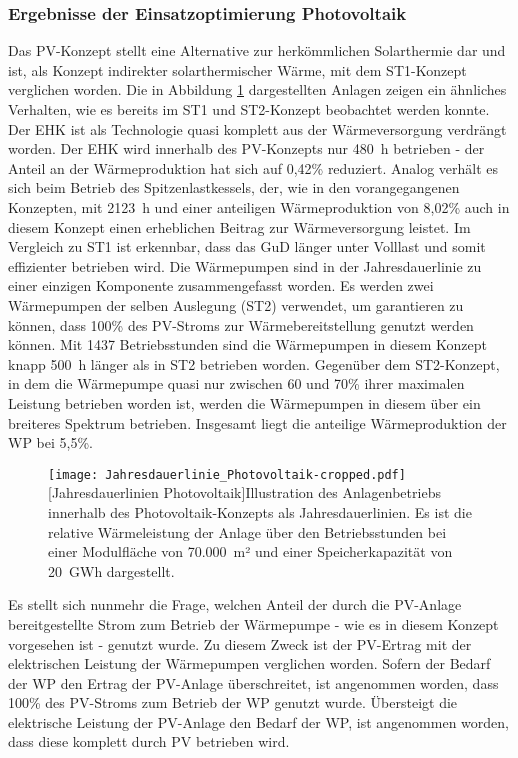\subsubsection{Ergebnisse der Einsatzoptimierung Photovoltaik}
Das \acl{PV}-Konzept stellt eine Alternative zur herkömmlichen Solarthermie dar und ist, als Konzept indirekter solarthermischer Wärme, mit dem ST1-Konzept verglichen worden. Die in Abbildung \ref{figure: Jahresdauerlinie_Photovoltaik} dargestellten Anlagen zeigen ein ähnliches Verhalten, wie es bereits im ST1 und ST2-Konzept beobachtet werden konnte. Der \ac{EHK} ist als Technologie quasi komplett aus der Wärmeversorgung verdrängt worden. Der \ac{EHK} wird innerhalb des \ac{PV}-Konzepts nur 480~h betrieben - der Anteil an der Wärmeproduktion hat sich auf 0,42\% reduziert. Analog verhält es sich beim Betrieb des Spitzenlastkessels, der, wie in den vorangegangenen Konzepten, mit 2123~h und einer anteiligen Wärmeproduktion von 8,02\% auch in diesem Konzept einen erheblichen Beitrag zur Wärmeversorgung leistet. Im Vergleich zu ST1 ist erkennbar, dass das \ac{GuD} länger unter Volllast und somit effizienter betrieben wird. Die Wärmepumpen sind in der Jahresdauerlinie zu einer einzigen Komponente zusammengefasst worden. Es werden zwei Wärmepumpen der selben Auslegung (ST2) verwendet, um garantieren zu können, dass 100\% des \ac{PV}-Stroms zur Wärmebereitstellung genutzt werden können.   Mit 1437 Betriebsstunden sind die Wärmepumpen in diesem Konzept knapp 500~h länger als in ST2 betrieben worden. Gegenüber dem ST2-Konzept, in dem die Wärmepumpe quasi nur zwischen 60 und 70\% ihrer maximalen Leistung betrieben worden ist, werden die Wärmepumpen in diesem über ein breiteres Spektrum betrieben. Insgesamt liegt die anteilige Wärmeproduktion der \ac{WP} bei 5,5\%. 
	\begin{figure}[ht]
		\centering
		\texttt{[image: Jahresdauerlinie\_Photovoltaik-cropped.pdf]}
		[Jahresdauerlinien Photovoltaik]{Illustration des Anlagenbetriebs innerhalb des Photovoltaik-Konzepts als Jahresdauerlinien. Es ist die relative Wärmeleistung der Anlage über den Betriebsstunden bei einer Modulfläche von 70.000~m² und einer Speicherkapazität von 20~GWh dargestellt.}
		\label{figure: Jahresdauerlinie_Photovoltaik}
	\end{figure}

Es stellt sich nunmehr die Frage, welchen Anteil der durch die \ac{PV}-Anlage bereitgestellte Strom zum Betrieb der Wärmepumpe - wie es in diesem Konzept vorgesehen ist - genutzt wurde. Zu diesem Zweck ist der \ac{PV}-Ertrag mit der elektrischen Leistung der Wärmepumpen verglichen worden. Sofern der Bedarf der \ac{WP} den Ertrag der \ac{PV}-Anlage überschreitet, ist angenommen worden, dass 100\% des \ac{PV}-Stroms zum Betrieb der \ac{WP} genutzt wurde. Übersteigt die elektrische Leistung der \ac{PV}-Anlage den Bedarf der \ac{WP}, ist angenommen worden, dass diese komplett durch \ac{PV} betrieben wird. 

